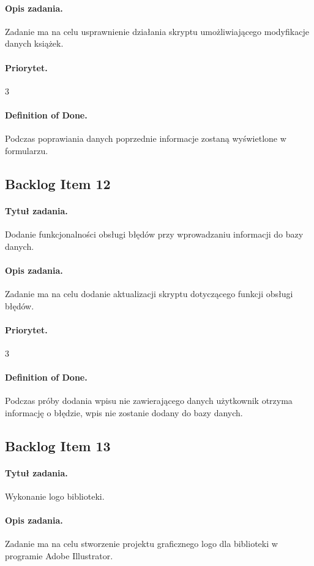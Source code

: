 \documentclass[a4paper]{article}
\begin{document}
\paragraph{Opis zadania.}Zadanie ma na celu usprawnienie działania skryptu umożliwiającego modyfikacje danych książek.
\paragraph{Priorytet.}3
\paragraph{Definition of Done.}Podczas poprawiania danych poprzednie informacje zostaną wyświetlone w formularzu.

\subsection{Backlog Item 12}
\paragraph{Tytuł zadania.}Dodanie funkcjonalności obsługi błędów przy wprowadzaniu informacji do bazy danych.
\paragraph{Opis zadania.}Zadanie ma na celu dodanie aktualizacji skryptu dotyczącego funkcji obsługi błędów.
\paragraph{Priorytet.}3
\paragraph{Definition of Done.}Podczas próby dodania wpisu nie zawierającego danych użytkownik otrzyma informację o błędzie, wpis nie zostanie dodany do bazy danych.

\subsection{Backlog Item 13}
\paragraph{Tytuł zadania.} Wykonanie logo biblioteki.
\paragraph{Opis zadania.} Zadanie ma na celu stworzenie projektu graficznego logo dla biblioteki w programie Adobe Illustrator.
\end{document}
